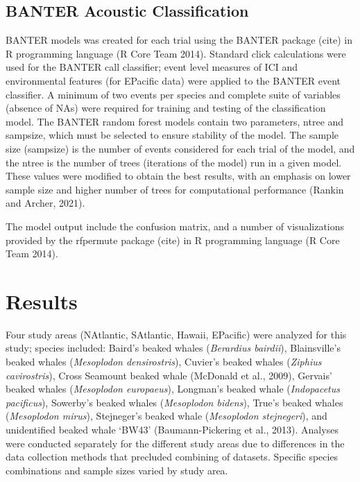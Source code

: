 \documentclass[
  letterpaper,
  DIV=11,
  numbers=noendperiod]{scrartcl}
\begin{document}
\hypertarget{banter-acoustic-classification}{%
\subsection{BANTER Acoustic
Classification}\label{banter-acoustic-classification}}

BANTER models was created for each trial using the BANTER package (cite)
in R programming language (R Core Team 2014). Standard click
calculations were used for the BANTER call classifier; event level
measures of ICI and environmental features (for EPacific data) were
applied to the BANTER event classifier. A minimum of two events per
species and complete suite of variables (absence of NAs) were required
for training and testing of the classification model. The BANTER random
forest models contain two parameters, ntree and sampsize, which must be
selected to ensure stability of the model. The sample size (sampsize) is
the number of events considered for each trial of the model, and the
ntree is the number of trees (iterations of the model) run in a given
model. These values were modified to obtain the best results, with an
emphasis on lower sample size and higher number of trees for
computational performance (Rankin and Archer, 2021).

The model output include the confusion matrix, and a number of
visualizations provided by the rfpermute package (cite) in R programming
language (R Core Team 2014).

\hypertarget{results}{%
\section{Results}\label{results}}

Four study areas (NAtlantic, SAtlantic, Hawaii, EPacific) were analyzed
for this study; species included: Baird's beaked whales (\emph{Berardius
bairdii}), Blainsville's beaked whales (\emph{Mesoplodon densirostris}),
Cuvier's beaked whales (\emph{Ziphius cavirostris}), Cross Seamount
beaked whale (McDonald et al., 2009), Gervais' beaked whales
(\emph{Mesoplodon europaeus}), Longman's beaked whale (\emph{Indopacetus
pacificus}), Sowerby's beaked whales (\emph{Mesoplodon bidens}), True's
beaked whales (\emph{Mesoplodon mirus}), Stejneger's beaked whale
(\emph{Mesoplodon stejnegeri}), and unidentified beaked whale `BW43'
(Baumann-Pickering et al., 2013). Analyses were conducted separately for
the different study areas due to differences in the data collection
methods that precluded combining of datasets. Specific species
combinations and sample sizes varied by study area.
\end{document}
